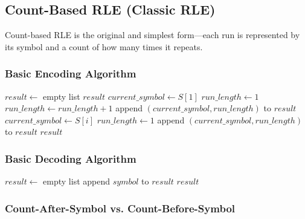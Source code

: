 \newpage
\subsection{Count-Based RLE (Classic RLE)}

Count-based RLE is the original and simplest form—each run is represented by its symbol and a count of how many times it repeats.

\subsubsection{Basic Encoding Algorithm}

\begin{algorithm}[H]
\caption{Count-Based RLE Encoding}
\begin{algorithmic}[1]
    \State $result \gets$ empty list
        \State \Return $result$
    \EndIf
    \State $current\_symbol \gets S[1]$
    \State $run\_length \gets 1$
            \State $run\_length \gets run\_length + 1$
        \Else
            \State append $(current\_symbol, run\_length)$ to $result$
            \State $current\_symbol \gets S[i]$
            \State $run\_length \gets 1$
        \EndIf
    \EndFor
    \State append $(current\_symbol, run\_length)$ to $result$ 
    \State \Return $result$
\EndProcedure
\end{algorithmic}
\end{algorithm}

\subsubsection{Basic Decoding Algorithm}

\begin{algorithm}[H]
\caption{Count-Based RLE Decoding}
\begin{algorithmic}[1]
    \State $result \gets$ empty list
            \State append $symbol$ to $result$
        \EndFor
    \EndFor
    \State \Return $result$
\EndProcedure
\end{algorithmic}
\end{algorithm}

\subsubsection{Count-After-Symbol vs. Count-Before-Symbol}

